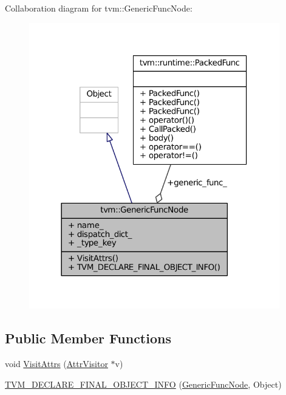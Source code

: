 Collaboration diagram for tvm\+:\+:Generic\+Func\+Node\+:
\nopagebreak
\begin{figure}[H]
\begin{center}
\leavevmode
\includegraphics[width=309pt]{classtvm_1_1GenericFuncNode__coll__graph}
\end{center}
\end{figure}
\subsection*{Public Member Functions}
\begin{DoxyCompactItemize}
\item 
void \hyperlink{classtvm_1_1GenericFuncNode_a1a2d059b54cdacc0b4c97e00a3e3b905}{Visit\+Attrs} (\hyperlink{classtvm_1_1AttrVisitor}{Attr\+Visitor} $\ast$v)
\item 
\hyperlink{classtvm_1_1GenericFuncNode_a2d82e7bd9db66ff84ec723fd19fe76af}{T\+V\+M\+\_\+\+D\+E\+C\+L\+A\+R\+E\+\_\+\+F\+I\+N\+A\+L\+\_\+\+O\+B\+J\+E\+C\+T\+\_\+\+I\+N\+FO} (\hyperlink{classtvm_1_1GenericFuncNode}{Generic\+Func\+Node}, Object)
\end{DoxyCompactItemize}

